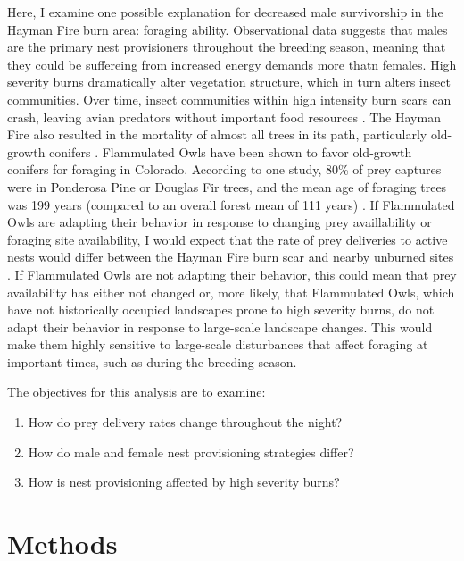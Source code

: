 \documentclass[]{article}
\providecommand{\tightlist}{%
  \setlength{\itemsep}{0pt}\setlength{\parskip}{0pt}}
\begin{document}
Here, I examine one possible explanation for decreased male survivorship
in the Hayman Fire burn area: foraging ability. Observational data
suggests that males are the primary nest provisioners throughout the
breeding season, meaning that they could be suffereing from increased
energy demands more thatn females. High severity burns dramatically
alter vegetation structure, which in turn alters insect communities.
Over time, insect communities within high intensity burn scars can
crash, leaving avian predators without important food resources
\citep{nappi2010effect}. The Hayman Fire also resulted in the mortality
of almost all trees in its path, particularly old-growth conifers
\citep{fornwalt2016did}. Flammulated Owls have been shown to favor
old-growth conifers for foraging in Colorado. According to one study,
80\% of prey captures were in Ponderosa Pine or Douglas Fir trees, and
the mean age of foraging trees was 199 years (compared to an overall
forest mean of 111 years) \citep{reynolds1992flammulated}. If
Flammulated Owls are adapting their behavior in response to changing
prey availlability or foraging site availability, I would expect that
the rate of prey deliveries to active nests would differ between the
Hayman Fire burn scar and nearby unburned sites
\citep{zarybnicka2009tengmalm}. If Flammulated Owls are not adapting
their behavior, this could mean that prey availability has either not
changed or, more likely, that Flammulated Owls, which have not
historically occupied landscapes prone to high severity burns, do not
adapt their behavior in response to large-scale landscape changes. This
would make them highly sensitive to large-scale disturbances that affect
foraging at important times, such as during the breeding season.

The objectives for this analysis are to examine:

\begin{enumerate}
\def\labelenumi{\arabic{enumi}.}
\tightlist
\item
  How do prey delivery rates change throughout the night?
\item
  How do male and female nest provisioning strategies differ?
\item
  How is nest provisioning affected by high severity burns?
\end{enumerate}

\hypertarget{methods}{%
\section{Methods}\label{methods}}
\end{document}

